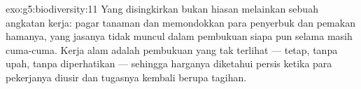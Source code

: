 \begin{solution}{exo:g5:biodiversity:11}
Yang disingkirkan bukan hiasan melainkan sebuah angkatan kerja:
 pagar tanaman dan  memondokkan para penyerbuk dan
pemakan hamanya, yang jasanya tidak muncul dalam pembukuan siapa pun
selama masih cuma-cuma. Kerja alam adalah pembukuan yang tak terlihat
--- tetap, tanpa upah, tanpa diperhatikan --- sehingga harganya
diketahui persis ketika para pekerjanya diusir dan tugasnya kembali
berupa tagihan.
\end{solution}
